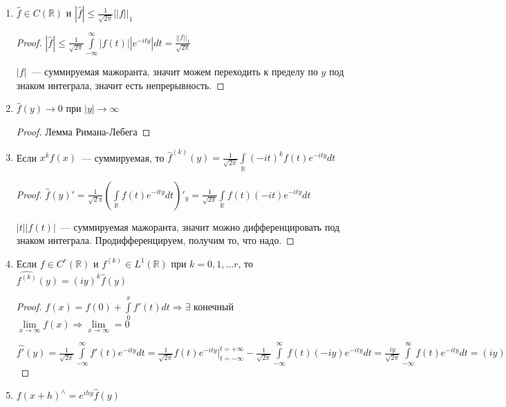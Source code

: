 \begin{properties}
    \begin{enumerate}
        \item $\hat f \in C(\mathbb{R})$ и $|\hat f| \leqslant \frac{1}{\sqrt{2\pi}}||f||_1$

              \begin{proof}
                  $|\hat f| \leqslant \frac{1}{\sqrt{2\pi}} \int\limits_{-\infty}^{\infty} |f(t)| |e^{-ity}| dt = \frac{||f||_1}{\sqrt{2\pi}}$

                  $|f|$~--- суммируемая мажоранта, значит можем переходить к пределу по $y$ под знаком интеграла, значит есть непрерывность.
              \end{proof}

        \item $\hat f(y) \rightarrow 0$ при $|y| \rightarrow \infty$

              \begin{proof}
                  Лемма Римана-Лебега
              \end{proof}

        \item Если $x^kf(x)$~--- суммируемая, то $\hat f^{(k)}(y) = \frac{1}{\sqrt{2\pi}} \int\limits_{\mathbb{R}} (-it)^k f(t) e^{-ity} dt$

              \begin{proof}
                  $\hat f(y)' = \frac{1}{\sqrt{2}{\pi}} (\int\limits_{\mathbb{R}} f(t) e^{-ity} dt)'_y = \frac{1}{\sqrt{2\pi}} \int\limits_{\mathbb{R}} f(t) (-it) e^{-ity}dt$

                  $|t||f(t)|$~--- суммируемая мажоранта, значит можно дифференцировать под знаком интеграла. Продифференцируем, получим то, что надо.
              \end{proof}

        \item Если $f \in C^r(\mathbb{R})$ и $f^{(k)} \in L^1(\mathbb{R})$ при $k = 0,1, \dots r$, то $\widehat{f^{(k)}} (y) = (iy)^{k}\hat f(y)$

              \begin{proof}
                  $f(x) = f(0) + \int\limits_0^x f'(t)dt \Rightarrow \exists$ конечный $\lim\limits_{x \rightarrow \infty} f(x) \Rightarrow \lim\limits_{x \rightarrow \infty} = 0$

                  $\widehat{f'}(y) = \frac{1}{\sqrt{2\pi}}\int\limits_{-\infty}^{\infty} f'(t) e^{-ity}dt =
                      \frac{1}{\sqrt{2\pi}} f(t)e^{-ity}|_{t = -\infty}^{t = +\infty} - \frac{1}{\sqrt{2\pi}} \int\limits_{-\infty}^{\infty} f(t)(-iy)e^{-ity}dt =
                      \frac{iy}{\sqrt{2\pi}}\int\limits_{-\infty}^{\infty}f(t)e^{-ity}dt = (iy)\hat f(y)$
              \end{proof}
        \item $f(x+h)^\wedge = e^{ihy}\hat f(y)$


\end{enumerate}
\end{properties}
